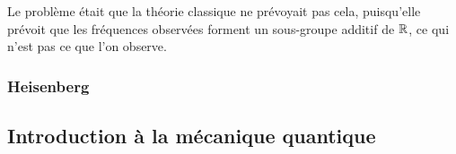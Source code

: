 Le problème était que la théorie classique ne prévoyait pas cela, puisqu'elle prévoit que les fréquences observées forment un sous-groupe additif de $\mathbb R$, ce qui n'est pas ce que l'on observe.

































\subsubsection{Heisenberg}

\subsection{Introduction à la mécanique quantique}
